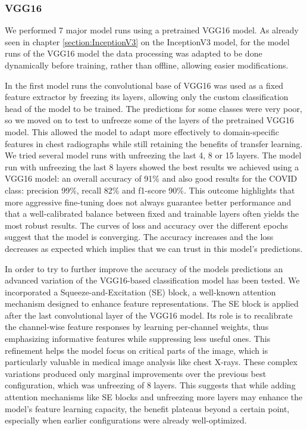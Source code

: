 \documentclass{article}
\begin{document}

\subsubsection {VGG16} 
We performed 7 major model runs using a pretrained VGG16 model. As already seen in chapter \ref{section:InceptionV3} on the InceptionV3 model, for the model runs of the VGG16 model the data processing was adapted to be done dynamically before training, rather than offline, allowing easier modifications.

In the first model runs the convolutional base of VGG16 was used as a fixed feature extractor by freezing its layers, allowing only the custom classification head of the model to be trained. The predictions for some classes were very poor, so we moved on to test to unfreeze some of the layers of the pretrained VGG16 model. This allowed the model to adapt more effectively to domain-specific features in chest radiographs while still retaining the benefits of transfer learning. We tried several model runs with unfreezing the last 4, 8 or 15 layers. The model run with unfreezing the last 8 layers showed the best results we achieved using a VGG16 model: an overall accuracy of 91\% and also good results for the COVID class: precision 99\%, recall 82\% and f1-score 90\%. This outcome highlights that more aggressive fine-tuning does not always guarantee better performance and that a well-calibrated balance between fixed and trainable layers often yields the most robust results. The curves of loss and accuracy over the different epochs suggest that the model is converging. The accuracy increases and the loss decreases as expected which implies that we can trust in this model's predictions.

In order to try to further improve the accuracy of the models predictions an advanced variation of the VGG16-based classification model has been tested. We incorporated a Squeeze-and-Excitation (SE) block, a well-known attention mechanism designed to enhance feature representations. The SE block is applied after the last convolutional layer of the VGG16 model. Its role is to recalibrate the channel-wise feature responses by learning per-channel weights, thus emphasizing informative features while suppressing less useful ones. This refinement helps the model focus on critical parts of the image, which is particularly valuable in medical image analysis like chest X-rays. These complex variations produced only marginal improvements over the previous best configuration, which was unfreezing of 8 layers. This suggests that while adding attention mechanisms like SE blocks and unfreezing more layers may enhance the model’s feature learning capacity, the benefit plateaus beyond a certain point, especially when earlier configurations were already well-optimized. 
\end{document}
